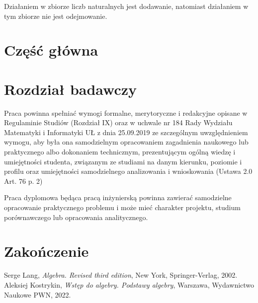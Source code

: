 \documentclass[magisterska]{pracadypl}
\begin{document}
Działaniem w zbiorze liczb naturalnych jest dodawanie, natomiast działaniem w tym zbiorze nie jest odejmowanie.




\chapter{Część główna}




\chapter{Rozdział badawczy}

Praca powinna spełniać wymogi formalne, merytoryczne i redakcyjne opisane w Regulaminie  Studiów (Rozdział IX) oraz w uchwale nr 184 Rady Wydziału Matematyki i Informatyki UŁ z dnia 25.09.2019 ze szczególnym uwzględnieniem wymogu, aby była ona samodzielnym opracowaniem zagadnienia naukowego lub praktycznego albo dokonaniem technicznym, prezentującym ogólną wiedzę i umiejętności studenta, związanym ze studiami na danym kierunku, poziomie i profilu oraz umiejętności samodzielnego analizowania i wnioskowania (Ustawa 2.0 Art. 76 p. 2)

Praca dyplomowa będąca pracą inżynierską powinna zawierać samodzielne opracowanie praktycznego problemu i może mieć charakter projektu, studium porównawczego lub opracowania analitycznego.




\chapter{Zakończenie}




\begin{thebibliography}{7}
%
Serge Lang, 
\textit{Algebra. Revised third edition}, 
New York, Springer-Verlag, 2002.
%
Aleksiej Kostrykin, 
\textit{Wstęp do algebry. Podstawy algebry},
Warszawa, Wydawnictwo Naukowe PWN, 2022.
\end{thebibliography}
\end{document}
